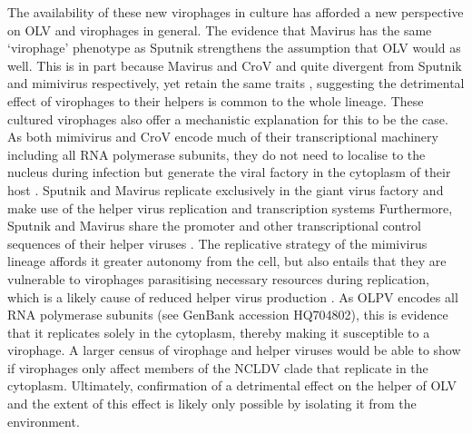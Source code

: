 The availability of these new virophages in culture has afforded a new perspective on \ac{OLV} and virophages in general.
The evidence that Mavirus has the same `virophage' phenotype as Sputnik strengthens the assumption that \ac{OLV} would as well.
This is in part because Mavirus and \ac{CroV} and quite divergent from Sputnik and mimivirus respectively, yet retain the same traits \cite{Fischer2010, Fischer2011a}, suggesting the detrimental effect of virophages to their helpers is common to the whole lineage.
These cultured virophages also offer a mechanistic explanation for this to be the case.
As both mimivirus and \ac{CroV} encode much of their transcriptional machinery including all \textsc{RNA} polymerase subunits, they do not need to localise to the nucleus during infection but generate the viral factory in the cytoplasm of their host \cite{LaScola2008, Fischer2011a}.
Sputnik and Mavirus replicate exclusively in the giant virus factory and make use of the helper virus replication and transcription systems \cite{LaScola2008, Fischer2011a}
Furthermore, Sputnik and Mavirus share the promoter and other transcriptional control sequences of their helper viruses \cite{Claverie2009, Fischer2011a}.
The replicative strategy of the mimivirus lineage affords it greater autonomy from the cell, but also entails that they are vulnerable to virophages parasitising necessary resources during replication, which is a likely cause of reduced helper virus production \cite{Claverie2009, Fischer2011a, Fischer2011b}.
As \ac{OLPV} encodes all \textsc{RNA} polymerase subunits (see GenBank accession HQ704802), this is evidence that it replicates solely in the cytoplasm, thereby making it susceptible to a virophage.
A larger census of virophage and helper viruses would be able to show if virophages only affect members of the \ac{NCLDV} clade that replicate in the cytoplasm.
Ultimately, confirmation of a detrimental effect on the helper of \ac{OLV} and the extent of this effect is likely only possible by isolating it from the environment.

